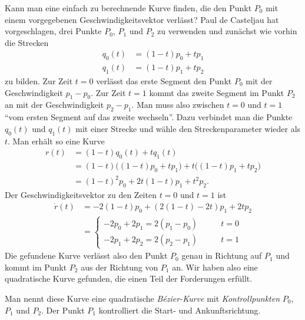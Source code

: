 Kann man eine einfach zu berechnende Kurve finden, die den Punkt $P_0$
mit einem vorgegebenen Geschwindigkeitsvektor verlässt?
Paul de Casteljau hat vorgeschlagen, drei Punkte $P_0$, $P_1$ und $P_2$
zu verwenden und zunächst wie vorhin die Strecken 
\begin{align*}
q_0(t) &= (1-t) p_0 + t p_1 \\
q_1(t) &= (1-t) p_1 + t p_2 
\end{align*}
zu bilden.
Zur Zeit $t=0$ verlässt das erste Segment den Punkt $P_0$ mit der
Geschwindigkeit $p_1-p_0$.
Zur Zeit $t=1$ kommt das zweite Segment im Punkt $P_2$ an mit der
Geschwindigkeit $p_2-p_1$.
Man muss also zwischen $t=0$ und $t=1$ ``vom ersten Segment auf das zweite
wechseln''.
Dazu verbindet man die Punkte $q_0(t)$ und $q_1(t)$ mit einer Strecke und
wähle den Streckenparameter wieder als $t$.
Man erhält so eine Kurve
\begin{align*}
r(t)
&=
(1-t) q_0(t) + t q_1(t)
\\
&=
(1-t) \bigl( (1-t)p_0 + tp_1\bigr)
+
t \bigl( (1-t)p_1 + tp_2\bigr)
\\
&=
(1-t)^2 p_0 + 2t(1-t) p_1 + t^2 p_2.
\end{align*}
Der Geschwindigkeitsvektor zu den Zeiten $t=0$ und $t=1$ ist
\begin{align*}
\dot{r}(t)
&=
-2(1-t)p_0 + (2(1-t)-2t) p_1 + 2tp_2
\\
&=\begin{cases}
-2p_0+2p_1=2(p_1-p_0)&\qquad t=0
\\
-2p_1+2p_2=2(p_2-p_1)&\qquad t=1
\end{cases}
\end{align*}
Die gefundene Kurve verlässt also den Punkt $P_0$ genau in Richtung
auf $P_1$ und kommt im Punkt $P_2$ aus der Richtung von $P_1$ an.
Wir haben also eine quadratische Kurve gefunden, die einen Teil 
der Forderungen erfüllt.

Man nennt diese Kurve eine quadratische {\em Bézier-Kurve} mit
{\em Kontrollpunkten} $P_0$, $P_1$ und $P_2$.
Der Punkt $P_1$ kontrolliert die Start- und Ankunftsrichtung.

